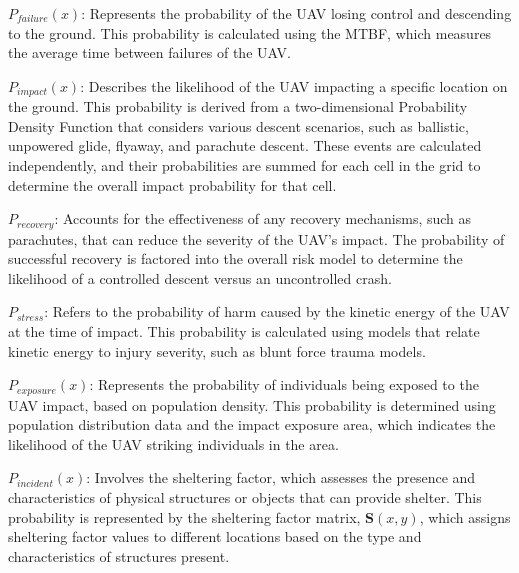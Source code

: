 \documentclass[12pt]{report}
\begin{document}
        \begin{myitemize}
            \item \(P_{failure}(x)\): Represents the probability of the UAV losing control and descending to the ground.
            This probability is calculated using the MTBF, which measures the average time between failures of the UAV. 
                    
            \item \(P_{impact}(x)\): Describes the likelihood of the UAV impacting a specific location on the ground.
            This probability is derived from a two-dimensional Probability Density Function that considers various
            descent scenarios, such as ballistic, unpowered glide, flyaway, and parachute descent. These events are
            calculated independently, and their probabilities are summed for each cell in the grid to determine the
            overall impact probability for that cell.
                    
            \item \(P_{recovery}\): Accounts for the effectiveness of any recovery mechanisms, such as parachutes, that
            can reduce the severity of the UAV's impact. The probability of successful recovery is factored into the
            overall risk model to determine the likelihood of a controlled descent versus an uncontrolled crash.
                    
            \item \(P_{stress}\): Refers to the probability of harm caused by the kinetic energy of the UAV at the time
            of impact. This probability is calculated using models that relate kinetic energy to injury severity, such
            as blunt force trauma models. 
                    
            \item \(P_{exposure}(x)\): Represents the probability of individuals being exposed to the UAV impact, based
            on population density. This probability is determined using population distribution data and the impact
            exposure area, which indicates the likelihood of the UAV striking individuals in the area.
                    
            \item \(P_{incident}(x)\): Involves the sheltering factor, which assesses the presence and characteristics
            of physical structures or objects that can provide shelter. This probability is represented by the
            sheltering factor matrix, \(\mathbf{S}(x, y)\), which assigns sheltering factor values to different
            locations based on the type and characteristics of structures present.
        \end{myitemize}
\end{document}
